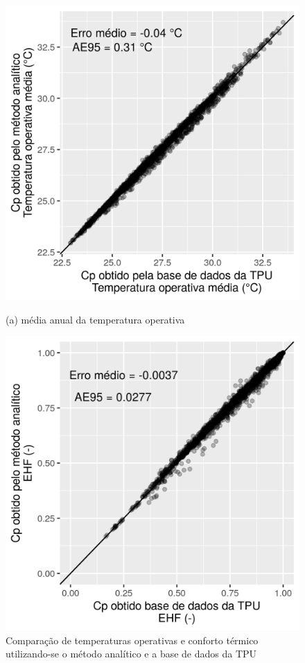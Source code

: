 \documentclass[brazil,hardcopy,openany]{ufscthesis} %
\begin{document}
\begin{figure}[h]
	\centering
	\caption{Comparação de temperaturas operativas e conforto térmico utilizando-se o método analítico e a base de dados da TPU}
	\begin{minipage}{.5\textwidth}
		\centering
		\includegraphics[width=\linewidth]{img/cpaverage_temp_scatter.png}
		\begin{center}
			\small{(a) média anual da temperatura operativa}
		\end{center}
	\end{minipage}%
	\begin{minipage}{.5\textwidth}
		\centering
		\includegraphics[width=\linewidth]{img/cpaverage_EHF_scatter.png}

\end{minipage}
\end{figure}
\end{document}
